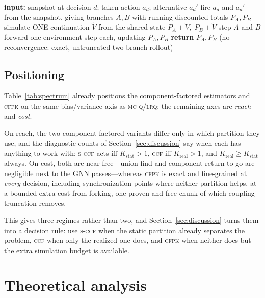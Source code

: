 \documentclass[review,authoryear,3p,times]{elsarticle}
\newcommand{\ccf}{\textsc{ccf}}
\newcommand{\sccf}{\textsc{s-ccf}}
\newcommand{\mcq}{\textsc{mc-q}}
\newcommand{\lrq}{\textsc{lrq}}
\newcommand{\cfpk}{\textsc{cfpk}}
\newcommand{\Kstat}{K_{\mathrm{stat}}}
\newcommand{\Krea}{K_{\mathrm{real}}}
\begin{document}
\begin{algorithm}[t]
\caption{Coupling-truncated paired rollout (core of \cfpk)}
\label{alg:coupled}
\begin{algorithmic}[1]
\State \textbf{input:} snapshot at decision $d$; taken action $a_d$; alternative $a_d'$
\State fire $a_d$ and $a_d'$ from the snapshot, giving branches $A,B$ with running discounted totals $P_A,P_B$
   
    \State simulate ONE continuation $\tilde V$ from the shared state
    \State \Return $P_A+\tilde V,\; P_B+\tilde V$ 
  \EndIf
  \State step $A$ and $B$ forward one environment step each, updating $P_A,P_B$
\EndWhile
\State \textbf{return} $P_A,P_B$ (no reconvergence: exact, untruncated two-branch rollout)
\end{algorithmic}
\end{algorithm}

\subsection{Positioning}
\label{sec:method:positioning}

Table~\ref{tab:spectrum} already positions the component-factored estimators and
\cfpk{} on the same bias/variance axis as \mcq/\lrq; the remaining axes are
\emph{reach} and \emph{cost}.

On reach, the two component-factored variants differ only in which partition
they use, and the diagnostic counts of Section~\ref{sec:discussion} say when
each has anything to work with: \sccf{} acts iff $\Kstat>1$, \ccf{} iff
$\Krea>1$, and $\Krea\ge\Kstat$ always. On cost, both are near-free---union-find
and component return-to-go are negligible next to the GNN passes---whereas
\cfpk{} is exact and fine-grained at \emph{every} decision, including
synchronization points where neither partition helps, at a bounded extra cost
from forking, one proven and free chunk of which coupling truncation removes.

This gives three regimes rather than two, and Section~\ref{sec:discussion}
turns them into a decision rule: use \sccf{} when the static partition already
separates the problem, \ccf{} when only the realized one does, and \cfpk{} when
neither does but the extra simulation budget is available.

\section{Theoretical analysis}
\label{sec:theory}
\end{document}
